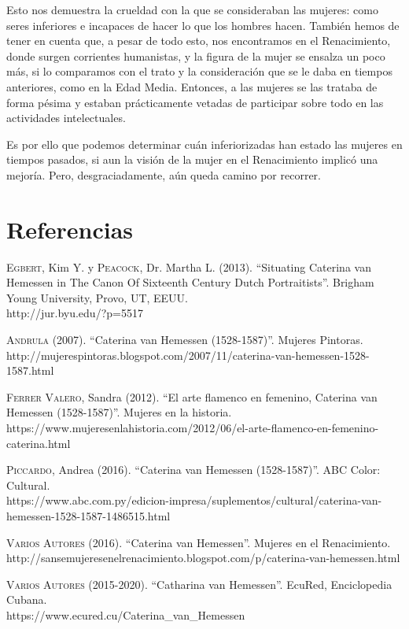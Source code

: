 \documentclass[12pt]{report}
\begin{document}
Esto nos demuestra la crueldad con la que se consideraban las mujeres: como seres inferiores e incapaces de hacer lo que los hombres hacen. También hemos de tener en cuenta que, a pesar de todo esto, nos encontramos en el Renacimiento, donde surgen corrientes humanistas, y la figura de la mujer se ensalza un poco más, si lo comparamos con el trato y la consideración que se le daba en tiempos anteriores, como en la Edad Media. Entonces, a las mujeres se las trataba de forma pésima y estaban prácticamente vetadas de participar sobre todo en las actividades intelectuales.\bigskip

Es por ello que podemos determinar cuán inferiorizadas han estado las mujeres en tiempos pasados, si aun la visión de la mujer en el Renacimiento implicó una mejoría. Pero, desgraciadamente, aún queda camino por recorrer.

\chapter{Referencias}

\textsc{Egbert}, Kim Y. y \textsc{Peacock}, Dr. Martha L. (2013). ``Situating Caterina van Hemessen in The Canon Of Sixteenth Century Dutch Portraitists''. Brigham Young University, Provo, UT, EEUU.\\
http://jur.byu.edu/?p=5517\bigskip

\textsc{Andrula} (2007). ``Caterina van Hemessen (1528-1587)''. Mujeres Pintoras.\\
http://mujerespintoras.blogspot.com/2007/11/caterina-van-hemessen-1528-1587.html\bigskip

\textsc{Ferrer Valero}, Sandra (2012). ``El arte flamenco en femenino, Caterina van Hemessen (1528-1587)''. Mujeres en la historia.\\
https://www.mujeresenlahistoria.com/2012/06/el-arte-flamenco-en-femenino-caterina.html\bigskip

\textsc{Piccardo}, Andrea (2016). ``Caterina van Hemessen (1528-1587)''. ABC Color: Cultural.\\
https://www.abc.com.py/edicion-impresa/suplementos/cultural/caterina-van-hemessen-1528-1587-1486515.html\bigskip

\textsc{Varios Autores} (2016). ``Caterina van Hemessen''. Mujeres en el Renacimiento.\\
http://sansemujeresenelrenacimiento.blogspot.com/p/caterina-van-hemessen.html\bigskip

\textsc{Varios Autores} (2015-2020). ``Catharina van Hemessen''. EcuRed, Enciclopedia Cubana.\\
https://www.ecured.cu/Caterina_van_Hemessen\bigskip
\end{document}
